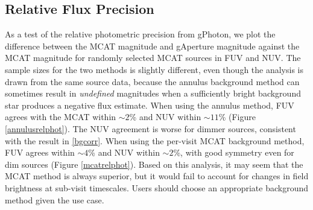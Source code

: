\documentclass[preprint]{aastex}
\begin{document}
\subsection{Relative Flux Precision}
\label{relflux}
As a test of the relative photometric precision from gPhoton, we plot the difference between the MCAT magnitude and gAperture magnitude against the MCAT magnitude for randomly selected MCAT sources in FUV and NUV. The sample sizes for the two methods is slightly different, even though the analysis is drawn from the same source data, because the annulus background method can sometimes result in \emph{undefined} magnitudes when a sufficiently bright background star produces a negative flux estimate. When using the annulus method, FUV agrees with the MCAT within $\sim 2$\% and NUV within $\sim 11$\% (Figure \ref{annulusrelphot}). The NUV agreement is worse for dimmer sources, consistent with the result in \ref{bgcorr}. When using the per-visit MCAT background method, FUV agrees within $\sim 4$\% and NUV within $\sim 2$\%, with good symmetry even for dim sources (Figure \ref{mcatrelphot}). Based on this analysis, it may seem that the MCAT method is always superior, but it would fail to account for changes in field brightness at sub-visit timescales. Users should choose an appropriate background method given the use case.
\end{document}
